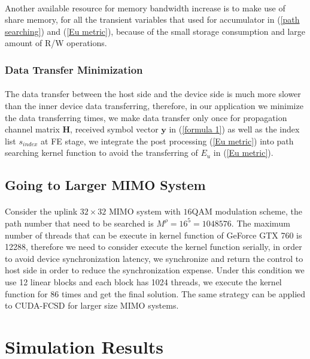 \documentclass[12pt,a4paper,final]{article}
\begin{document}
\begin{spacing}{2.5}
 \paragraph{}Another available resource for memory bandwidth increase is to make use of share memory, for all the transient variables that used for accumulator in (\ref{path searching}) and (\ref{Eu metric}), because of the small storage consumption and large amount of R/W operations.   
\subsubsection{Data Transfer Minimization}   
\paragraph{}The data transfer between the host side and the device side is much more slower than the inner device data transferring, therefore, in our application we minimize the data transferring times, we make data transfer only once for propagation channel matrix $\mathbf{H}$, received symbol vector $\mathbf{y}$ in (\ref{formula 1}) as well as the index list $\mathit{s_{index}}$ at FE stage, we integrate the post processing (\ref{Eu metric}) into path searching kernel function to avoid the transferring of $E_{u}$ in (\ref{Eu metric}).  
\subsection{Going to Larger MIMO System}
  \paragraph{}Consider the uplink $32\times 32$ MIMO system with $16$QAM modulation scheme, the path number that need to be searched is $M^{\rho}=16^{5}=1048576$. The maximum number of threads that can be execute in kernel function of GeForce GTX 760 is 12288, therefore we need to consider execute the kernel function serially, in order to avoid device synchronization latency, we synchronize and return the control to host side in order to reduce the synchronization expense. Under this condition we use 12 linear blocks and each block has 1024 threads, we execute the kernel function for 86 times and get the final solution. The same strategy can be applied to CUDA-FCSD for larger size MIMO systems. 
\section{Simulation Results}\label{simulation}

\end{spacing}
\end{document}
